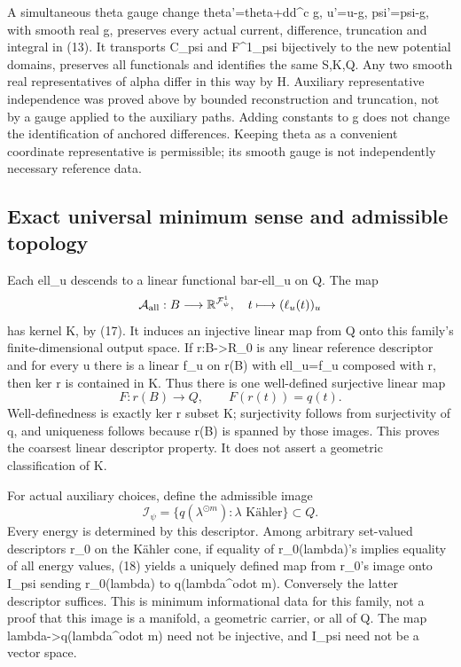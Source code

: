 \documentclass[
]{article}
\begin{document}
A simultaneous theta gauge change theta'=theta+dd\^{}c g, u'=u-g,
psi'=psi-g, with smooth real g, preserves every actual current,
difference, truncation and integral in (13). It transports C\_psi and
F\^{}1\_psi bijectively to the new potential domains, preserves all
functionals and identifies the same S,K,Q. Any two smooth real
representatives of alpha differ in this way by H. Auxiliary
representative independence was proved above by bounded reconstruction
and truncation, not by a gauge applied to the auxiliary paths. Adding
constants to g does not change the identification of anchored
differences. Keeping theta as a convenient coordinate representative is
permissible; its smooth gauge is not independently necessary reference
data.

\subsection{Exact universal minimum sense and admissible
topology}\label{exact-universal-minimum-sense-and-admissible-topology}

Each ell\_u descends to a linear functional bar-ell\_u on Q. The map \[
\mathcal{A}_{\rm all}:B\longrightarrow\mathbb{R}^{\mathcal{F}^1_\psi},
\quad t\longmapsto(\ell_u(t))_u
\] has kernel K, by (17). It induces an injective linear map from Q onto
this family's finite-dimensional output space. If r:B-\textgreater R\_0
is any linear reference descriptor and for every u there is a linear
f\_u on r(B) with ell\_u=f\_u composed with r, then ker r is contained
in K. Thus there is one well-defined surjective linear map \[
F:r(B)\longrightarrow Q,\qquad F(r(t))=q(t).
\] Well-definedness is exactly ker r subset K; surjectivity follows from
surjectivity of q, and uniqueness follows because r(B) is spanned by
those images. This proves the coarsest linear descriptor property. It
does not assert a geometric classification of K.

For actual auxiliary choices, define the admissible image \[
\mathcal{I}_\psi=\{q(\lambda^{\odot m}):\lambda\text{ Kähler}\}\subset Q.
\] Every energy is determined by this descriptor. Among arbitrary
set-valued descriptors r\_0 on the Kähler cone, if equality of
r\_0(lambda)'s implies equality of all energy values, (18) yields a
uniquely defined map from r\_0's image onto I\_psi sending r\_0(lambda)
to q(lambda\^{}odot m). Conversely the latter descriptor suffices. This
is minimum informational data for this family, not a proof that this
image is a manifold, a geometric carrier, or all of Q. The map
lambda-\textgreater q(lambda\^{}odot m) need not be injective, and
I\_psi need not be a vector space.
\end{document}

